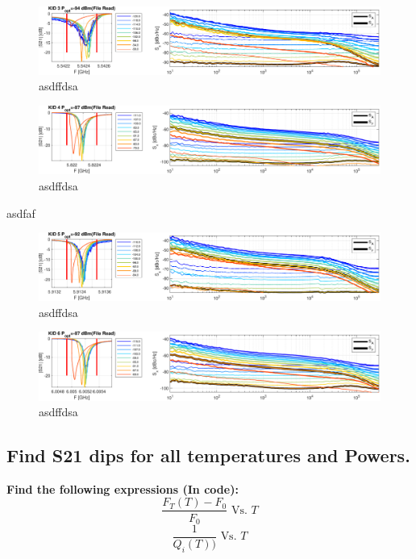 \begin{figure}[h!!!!!]
	\centering
	\includegraphics[width=\linewidth]{figures/chA_Appendix/Popt_KID3.pdf}
	\caption{asdffdsa}
	\label{fig:Popt_KID3}
\end{figure}

\begin{figure}[h!!!!!]
	\centering
	\includegraphics[width=\linewidth]{figures/chA_Appendix/Popt_KID4.pdf}
	\caption{asdffdsa}
	\label{fig:Popt_KID4}
\end{figure}
asdfaf
\begin{figure}[h!!!!!]
	\centering
	\includegraphics[width=\linewidth]{figures/chA_Appendix/Popt_KID5.pdf}
	\caption{asdffdsa}
	\label{fig:Popt_KID5}
\end{figure}
\begin{figure}[h!!!!!]
	\centering
	\includegraphics[width=\linewidth]{figures/chA_Appendix/Popt_KID6.pdf}
	\caption{asdffdsa}
	\label{fig:Popt_KID6}
\end{figure}


\FloatBarrier

\subsection*{Find S21 dips for all temperatures and Powers.}
\textbf{Find the following expressions (In code):}
\cite{janssenEquivalenceOpticalElectrical2014}
\begin{equation}
    \frac{F_{T}(T)-F_{0}}{F_{0}} \textrm{  Vs.  } T
\end{equation}
\begin{equation}
    \frac{1}{Q_{i}(T))} \textrm{  Vs.  } T
\end{equation}


